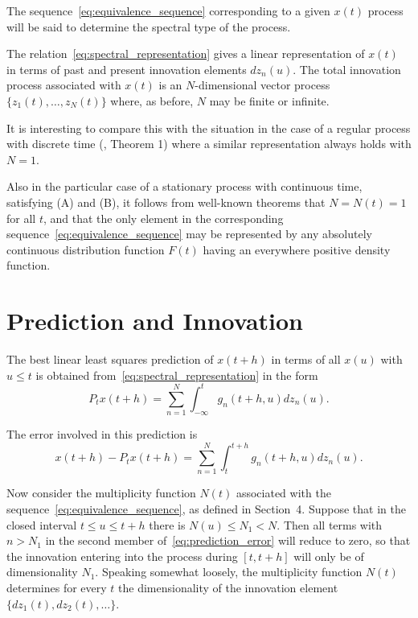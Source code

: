 \documentclass[11pt]{article}
\begin{document}
The sequence~\eqref{eq:equivalence_sequence} corresponding to a given $x(t)$ process will be said to determine the spectral type of the process.

The relation~\eqref{eq:spectral_representation} gives a linear representation of $x(t)$ in terms of past and present innovation elements $dz_n(u)$. The total innovation process associated with $x(t)$ is an $N$-dimensional vector process $\{z_1(t), \ldots, z_N(t)\}$ where, as before, $N$ may be finite or infinite.

It is interesting to compare this with the situation in the case of a regular process with discrete time (\cite{cramer1951}, Theorem 1) where a similar representation always holds with $N = 1$.

Also in the particular case of a stationary process with continuous time, satisfying (A) and (B), it follows from well-known theorems that $N = N(t) = 1$ for all $t$, and that the only element in the corresponding sequence~\eqref{eq:equivalence_sequence} may be represented by any absolutely continuous distribution function $F(t)$ having an everywhere positive density function.

\section{Prediction and Innovation}

The best linear least squares prediction of $x(t + h)$ in terms of all $x(u)$ with $u \leq t$ is obtained from~\eqref{eq:spectral_representation} in the form
\begin{equation}
P_t x(t + h) = \sum_{n=1}^N \int_{-\infty}^t g_n(t + h, u) dz_n(u).
\label{eq:prediction}
\end{equation}

The error involved in this prediction is
\begin{equation}
x(t + h) - P_t x(t + h) = \sum_{n=1}^N \int_t^{t+h} g_n(t + h, u) dz_n(u).
\label{eq:prediction_error}
\end{equation}

Now consider the multiplicity function $N(t)$ associated with the sequence~\eqref{eq:equivalence_sequence}, as defined in Section~4. Suppose that in the closed interval $t \leq u \leq t + h$ there is $N(u) \leq N_1 < N$. Then all terms with $n > N_1$ in the second member of~\eqref{eq:prediction_error} will reduce to zero, so that the innovation entering into the process during $[t, t + h]$ will only be of dimensionality $N_1$. Speaking somewhat loosely, the multiplicity function $N(t)$ determines for every $t$ the dimensionality of the innovation element $\{dz_1(t), dz_2(t), \ldots\}$.
\end{document}
